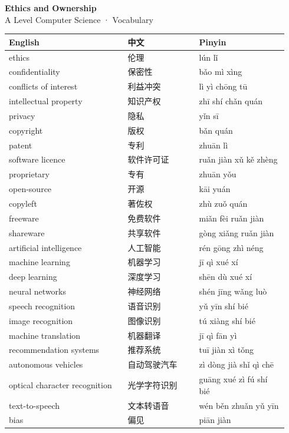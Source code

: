 \documentclass[11pt]{article}
\begin{document}
\begin{center}
  {\LARGE\bfseries Ethics and Ownership}\\[0.35em]
  {\large A Level Computer Science · Vocabulary}
\end{center}
\vspace{0.6em}

\begin{longtable}{@{}p{0.40\linewidth}p{0.24\linewidth}p{0.30\linewidth}@{}}
\toprule
\textbf{English} & \textbf{中文} & \textbf{Pinyin} \\
\midrule
\endhead
\bottomrule
\endlastfoot
ethics & 伦理 & lún lǐ \\
confidentiality & 保密性 & bǎo mì xìng \\
conflicts of interest & 利益冲突 & lì yì chōng tū \\
intellectual property & 知识产权 & zhī shí chǎn quán \\
privacy & 隐私 & yǐn sī \\
copyright & 版权 & bǎn quán \\
patent & 专利 & zhuān lì \\
software licence & 软件许可证 & ruǎn jiàn xǔ kě zhèng \\
proprietary & 专有 & zhuān yǒu \\
open-source & 开源 & kāi yuán \\
copyleft & 著佐权 & zhù zuǒ quán \\
freeware & 免费软件 & miǎn fèi ruǎn jiàn \\
shareware & 共享软件 & gòng xiǎng ruǎn jiàn \\
artificial intelligence & 人工智能 & rén gōng zhì néng \\
machine learning & 机器学习 & jī qì xué xí \\
deep learning & 深度学习 & shēn dù xué xí \\
neural networks & 神经网络 & shén jīng wǎng luò \\
speech recognition & 语音识别 & yǔ yīn shí bié \\
image recognition & 图像识别 & tú xiàng shí bié \\
machine translation & 机器翻译 & jī qì fān yì \\
recommendation systems & 推荐系统 & tuī jiàn xì tǒng \\
autonomous vehicles & 自动驾驶汽车 & zì dòng jià shǐ qì chē \\
optical character recognition & 光学字符识别 & guāng xué zì fú shí bié \\
text-to-speech & 文本转语音 & wén běn zhuǎn yǔ yīn \\
bias & 偏见 & piān jiàn \\
\end{longtable}
\end{document}
